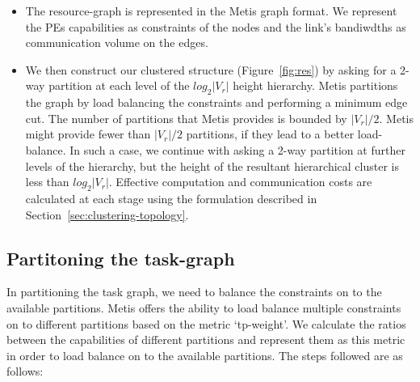 \begin{itemize}


\item The resource-graph is represented in the Metis graph format. We
  represent the PEs capabilities as constraints of the nodes and the
  link's bandiwdths as communication volume on the edges.

\item We then construct our clustered structure (Figure~\ref{fig:res})
  by asking for a 2-way partition at each level of the $log_2|V_r|$
  height hierarchy. Metis partitions the graph by load balancing the
  constraints and performing a minimum edge cut. The number of
  partitions that Metis provides is bounded by $|V_r|/2$. Metis might
  provide fewer than $|V_r|/2$ partitions, if they lead to a better
  load-balance. In such a case, we continue with asking a 2-way
  partition at further levels of the hierarchy, but the height of the
  resultant hierarchical cluster is less than $log_2|V_r|$. Effective
  computation and communication costs are calculated at each stage using
  the formulation described in Section~\ref{sec:clustering-topology}.

\end{itemize}

\subsection{Partitoning the task-graph}
\label{sec:part-task-graph}

In partitioning the task graph, we need to balance the constraints on to
the available partitions. Metis offers the ability to load balance
multiple constraints on to different partitions based on the metric
\mbox{`tp-weight'}. We calculate the ratios between the capabilities of
different partitions and represent them as this metric in order to load
balance on to the available partitions. The steps followed are as
follows:

